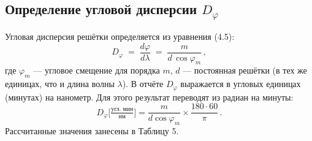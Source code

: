 \subsection*{Определение угловой дисперсии \(D_{\varphi}\)}

Угловая дисперсия решётки определяется из уравнения (4.5):
\[
	D_{\varphi} \;=\;\frac{d\varphi}{d\lambda}
	\;=\;\frac{m}{d\,\cos\varphi_m}\,,
\]
где \(\varphi_m\) — угловое смещение для порядка \(m\), \(d\) — постоянная решётки (в тех же единицах, что и длина волны \(\lambda\)).
В отчёте \(D_{\varphi}\) выражается в угловых единицах (минутах) на нанометр. Для этого результат переводят из радиан на минуты:
\[
	D_{\varphi}\bigl[\tfrac{\text{угл. мин}}{\text{нм}}\bigr]
	= \frac{m}{d\cos\varphi_m}\times\frac{180\cdot60}{\pi}\,.
\]
Рассчитанные значения занесены в Таблицу 5.
